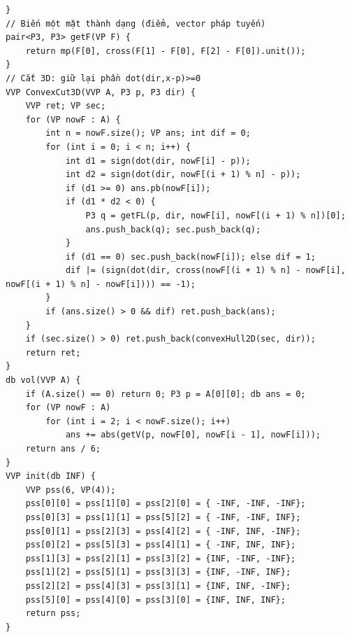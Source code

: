 \documentclass[11pt]{article}
\begin{document}
\begin{verbatim}
}
// Biến một mặt thành dạng (điểm, vector pháp tuyến)
pair<P3, P3> getF(VP F) {
	return mp(F[0], cross(F[1] - F[0], F[2] - F[0]).unit());
}
// Cắt 3D: giữ lại phần dot(dir,x-p)>=0
VVP ConvexCut3D(VVP A, P3 p, P3 dir) {
	VVP ret; VP sec;
	for (VP nowF : A) {
		int n = nowF.size(); VP ans; int dif = 0;
		for (int i = 0; i < n; i++) {
			int d1 = sign(dot(dir, nowF[i] - p));
			int d2 = sign(dot(dir, nowF[(i + 1) % n] - p));
			if (d1 >= 0) ans.pb(nowF[i]);
			if (d1 * d2 < 0) {
				P3 q = getFL(p, dir, nowF[i], nowF[(i + 1) % n])[0];
				ans.push_back(q); sec.push_back(q);
			}
			if (d1 == 0) sec.push_back(nowF[i]); else dif = 1;
			dif |= (sign(dot(dir, cross(nowF[(i + 1) % n] - nowF[i], nowF[(i + 1) % n] - nowF[i]))) == -1);
		}
		if (ans.size() > 0 && dif) ret.push_back(ans);
	}
	if (sec.size() > 0) ret.push_back(convexHull2D(sec, dir));
	return ret;
}
db vol(VVP A) {
	if (A.size() == 0) return 0; P3 p = A[0][0]; db ans = 0;
	for (VP nowF : A)
		for (int i = 2; i < nowF.size(); i++)
			ans += abs(getV(p, nowF[0], nowF[i - 1], nowF[i]));
	return ans / 6;
}
VVP init(db INF) {
	VVP pss(6, VP(4));
	pss[0][0] = pss[1][0] = pss[2][0] = { -INF, -INF, -INF};
	pss[0][3] = pss[1][1] = pss[5][2] = { -INF, -INF, INF};
	pss[0][1] = pss[2][3] = pss[4][2] = { -INF, INF, -INF};
	pss[0][2] = pss[5][3] = pss[4][1] = { -INF, INF, INF};
	pss[1][3] = pss[2][1] = pss[3][2] = {INF, -INF, -INF};
	pss[1][2] = pss[5][1] = pss[3][3] = {INF, -INF, INF};
	pss[2][2] = pss[4][3] = pss[3][1] = {INF, INF, -INF};
	pss[5][0] = pss[4][0] = pss[3][0] = {INF, INF, INF};
	return pss;
}
\end{verbatim}
\endgroup
\end{document}
